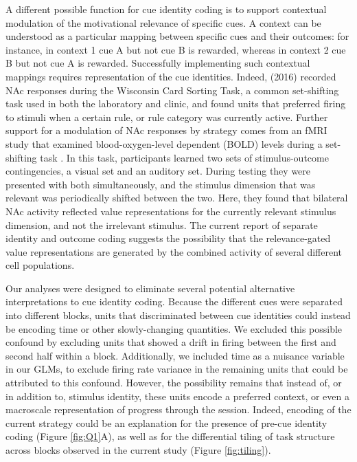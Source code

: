 \documentclass[11pt]{article}
\let\cite=\citep
\begin{document}
A different possible function for cue identity coding is to support contextual modulation of the motivational relevance of specific cues. A context can be understood as a particular mapping between specific cues and their outcomes: for instance, in context 1 cue A but not cue B is rewarded, whereas in context 2 cue B but not cue A is rewarded. Successfully implementing such contextual mappings requires representation of the cue identities. Indeed, \citeauthor{Sleezer2016} (2016) recorded NAc responses during the Wisconsin Card Sorting Task, a common set-shifting task used in both the laboratory and clinic, and found units that preferred firing to stimuli when a certain rule, or rule category was currently active. Further support for a modulation of NAc responses by strategy comes from an fMRI study that examined blood-oxygen-level dependent (BOLD) levels during a set-shifting task \cite{Fitzgerald2014}. In this task, participants learned two sets of stimulus-outcome contingencies, a visual set and an auditory set. During testing they were presented with both simultaneously, and the stimulus dimension that was relevant was periodically shifted between the two. Here, they found that bilateral NAc activity reflected value representations for the currently relevant stimulus dimension, and not the irrelevant stimulus. The current report of separate identity and outcome coding suggests the possibility that the relevance-gated value representations are generated by the combined activity of several different cell populations.

Our analyses were designed to eliminate several potential alternative interpretations to cue identity coding. Because the different cues were separated into different blocks, units that discriminated between cue identities could instead be encoding time or other slowly-changing quantities. We excluded this possible confound by excluding units that showed a drift in firing between the first and second half within a block. Additionally, we included time as a nuisance variable in our GLMs, to exclude firing rate variance in the remaining units that could be attributed to this confound. However, the possibility remains that instead of, or in addition to, stimulus identity, these units encode a preferred context, or even a macroscale representation of progress through the session. Indeed, encoding of the current strategy could be an explanation for the presence of pre-cue identity coding (Figure \ref{fig:Q1}A), as well as for the differential tiling of task structure across blocks observed in the current study (Figure \ref{fig:tiling}).
\end{document}
